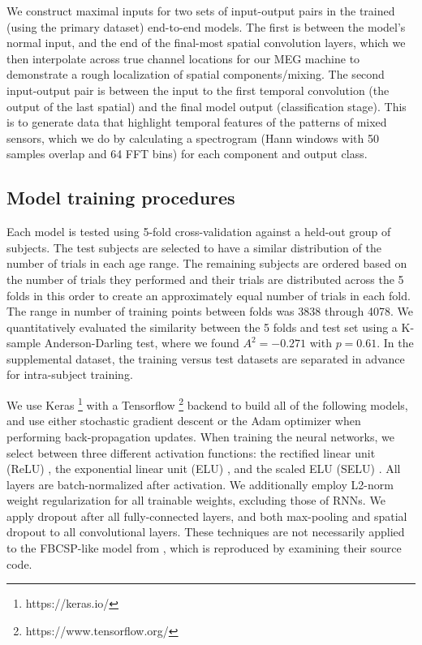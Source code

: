 \documentclass[fleqn,10pt]{wlscirep}
\begin{document}
We construct maximal inputs for two sets of input-output pairs in the trained (using the primary dataset) end-to-end models. The first is between the model's normal input, and the end of the final-most spatial convolution layers, which we then interpolate across true channel locations for our MEG machine to demonstrate a rough localization of spatial components/mixing. The second input-output pair is between the input to the first temporal convolution (the output of the last spatial) and the final model output (classification stage). This is to generate data that highlight temporal features of the patterns of mixed sensors, which we do by calculating a spectrogram (Hann windows with 50 samples overlap and 64 FFT bins) for each component and output class.

\subsection*{Model training procedures} \label{sec:train_proc}

Each model is tested using 5-fold cross-validation against a held-out group of subjects. The test subjects are selected to have a similar distribution of the number of trials in each age range. The remaining subjects are ordered based on the number of trials they performed and their trials are distributed across the 5 folds in this order to create an approximately equal number of trials in each fold. The range in number of training points between folds was 3838 through 4078. We quantitatively evaluated the similarity between the 5 folds and test set using a K-sample Anderson-Darling test, where we found $A^2=-0.271$ with $p=0.61$. In the supplemental dataset, the training versus test datasets are separated in advance for intra-subject training.

We use Keras \footnote{https://keras.io/} with a Tensorflow \footnote{https://www.tensorflow.org/} backend to build all of the following models, and use either stochastic gradient descent or the Adam optimizer\cite{Kingma2015} when performing back-propagation updates. When training the neural networks, we select between three different activation functions: the rectified linear unit (ReLU) \cite{He2015a}, the exponential linear unit (ELU) \cite{Clevert}, and the scaled ELU (SELU) \cite{NIPS2017_6698}. All layers are batch-normalized \cite{Szegedy2015} after activation. We additionally employ L2-norm weight regularization for all trainable weights, excluding those of RNNs. We apply dropout \cite{Srivastava2014} after all fully-connected layers, and both max-pooling and spatial dropout \cite{Tompson2015} to all convolutional layers. These techniques are not necessarily applied to the FBCSP-like model from \cite{Schirrmeister2017}, which is reproduced by examining their source code.
\end{document}
